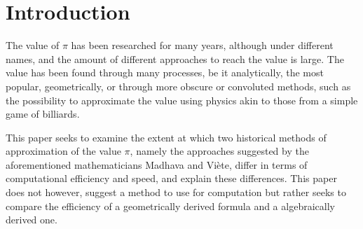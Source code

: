 \section{Introduction}


The value of $\pi$ has been researched for many years, although under different names,
and the amount of different approaches to reach the value is large. The value has been 
found through many processes, be it analytically, the most popular, geometrically, or through 
more obscure or convoluted methods, such as the possibility to approximate the value using 
physics akin to those from a simple game of billiards. \cite{galperin_2003}

This paper seeks to examine the extent at which two historical methods of
approximation of the value $\pi$, namely the approaches suggested by the aforementioned 
mathematicians Madhava and Viète, differ in terms of computational efficiency and 
speed, and explain these differences. This paper does not however, 
suggest a method to use for computation but rather seeks to compare the efficiency of
a geometrically derived formula and a algebraically derived one. 